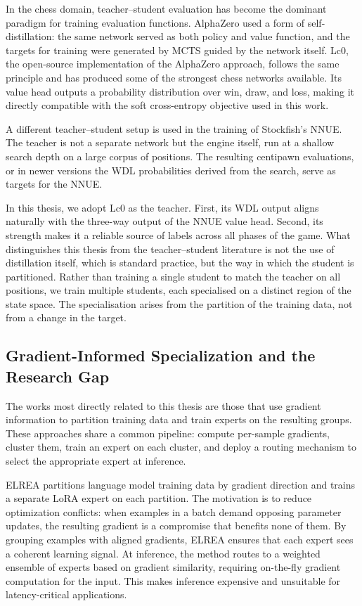 In the chess domain, teacher--student evaluation has become the dominant paradigm for training evaluation functions. AlphaZero used a form of self-distillation: the same network served as both policy and value function, and the targets for training were generated by MCTS guided by the network itself. Lc0, the open-source implementation of the AlphaZero approach, follows the same principle and has produced some of the strongest chess networks available. Its value head outputs a probability distribution over win, draw, and loss, making it directly compatible with the soft cross-entropy objective used in this work.

A different teacher--student setup is used in the training of Stockfish's NNUE. The teacher is not a separate network but the engine itself, run at a shallow search depth on a large corpus of positions. The resulting centipawn evaluations, or in newer versions the WDL probabilities derived from the search, serve as targets for the NNUE. 

In this thesis, we adopt Lc0 as the teacher. First, its WDL output aligns naturally with the three-way output of the NNUE value head. Second, its strength makes it a reliable source of labels across all phases of the game. What distinguishes this thesis from the teacher--student literature is not the use of distillation itself, which is standard practice, but the way in which the student is partitioned. Rather than training a single student to match the teacher on all positions, we train multiple students, each specialised on a distinct region of the state space. The specialisation arises from the partition of the training data, not from a change in the target.

\subsection{Gradient-Informed Specialization and the Research Gap}
The works most directly related to this thesis are those that use gradient information to partition training data and train experts on the resulting groups. These approaches share a common pipeline: compute per-sample gradients, cluster them, train an expert on each cluster, and deploy a routing mechanism to select the appropriate expert at inference.

ELREA partitions language model training data by gradient direction and trains a separate LoRA expert on each partition. The motivation is to reduce optimization conflicts: when examples in a batch demand opposing parameter updates, the resulting gradient is a compromise that benefits none of them. By grouping examples with aligned gradients, ELREA ensures that each expert sees a coherent learning signal. At inference, the method routes to a weighted ensemble of experts based on gradient similarity, requiring on-the-fly gradient computation for the input. This makes inference expensive and unsuitable for latency-critical applications.

